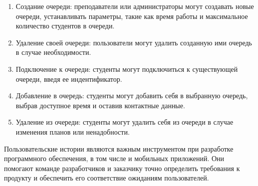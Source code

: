 \begin{enumerate}
    \item Создание очереди: преподаватели или администраторы
			могут создавать новые очереди, устанавливать параметры,
			такие как время работы и максимальное количество студентов
			в очереди.
    \item Удаление своей очереди: пользователи могут удалить созданную
		ими очередь в случае необходимости.
    \item Подключение к очереди: студенты могут подключиться
		к существующей очереди, введя ее индентификатор.
    \item Добавление в очередь: студенты могут добавить себя в выбранную
		очередь, выбрав доступное время и оставив контактные данные.
    \item Удаление из очереди: студенты могут удалить себя из очереди
		в случае изменения планов или ненадобности.
\end{enumerate}


Пользовательские истории являются важным инструментом
при разработке программного обеспечения, в том числе и мобильных приложений.
Они помогают команде разработчиков и заказчику точно определить требования
к продукту и обеспечить его соответствие ожиданиям пользователей.

